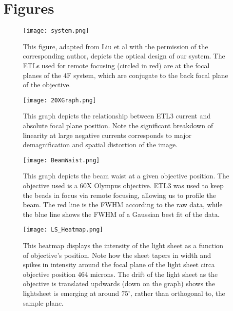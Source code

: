 \section{Figures}
\begin{figure}
    \centering
    \texttt{[image: system.png]}
    \caption[]{This figure, adapted from Liu et al \cite{Liu} with the permission of the corresponding author, depicts the optical design of our system. The ETLs used for remote focusing (circled in red) are at the focal planes of the 4F system, which are conjugate to the back focal plane of the objective.}
\end{figure}
\begin{figure}
    \centering
    \texttt{[image: 20XGraph.png]}
    \caption[]{This graph depicts the relationship between ETL3 current and absolute focal plane position. Note the significant breakdown of linearity at large negative currents corresponds to major demagnification and spatial distortion of the image.}
\end{figure}
\begin{figure}
    \centering
    \texttt{[image: BeamWaist.png]}
    \caption{This graph depicts the beam waist at a given objective position. The objective used is a 60X Olympus objective. ETL3 was used to keep the beads in focus via remote focusing, allowing us to profile the beam. The red line is the FWHM according to the raw data, while the blue line shows the FWHM of a Gaussian best fit of the data.}
\end{figure}
\begin{figure}
    \centering
    \texttt{[image: LS\_Heatmap.png]}
    \caption{This heatmap displays the intensity of the light sheet as a function of objective's position. Note how the sheet tapers in width and spikes in intensity around the focal plane of the light sheet circa objective position 464 microns. The drift of the light sheet as the objective is translated updwards (down on the graph) shows the lightsheet is emerging at around $75^\circ$, rather than orthogonal to, the sample plane.}
\end{figure}